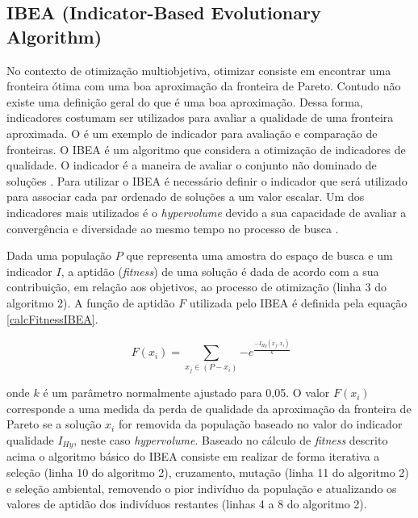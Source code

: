 \documentclass[conference]{IEEEtran}
\begin{document}
\subsection{IBEA (Indicator-Based Evolutionary Algorithm)}
No contexto de otimização multiobjetiva, otimizar consiste em encontrar uma fronteira ótima com uma boa aproximação da fronteira de Pareto. Contudo não existe uma definição geral do que é uma boa aproximação. Dessa forma, indicadores costumam ser utilizados para avaliar a qualidade de uma fronteira aproximada. O  é um exemplo de indicador para avaliação e comparação de fronteiras. 
O IBEA é um algoritmo que considera
a otimização de indicadores de qualidade. O indicador é a maneira de avaliar o conjunto não dominado de soluções \cite{figueiredo2013algoritmo}.
Para utilizar o IBEA é necessário definir o indicador que será utilizado para associar cada par ordenado de soluções a um valor escalar. Um dos indicadores mais utilizados é o \textit{hypervolume} devido a sua capacidade de avaliar a convergência e diversidade ao mesmo tempo no processo de busca \cite{ishibuchi2008evolutionary}. 

Dada uma população $P$ que representa uma amostra do espaço de busca e um indicador $I$, a aptidão (\textit{fitness}) de uma solução é dada de acordo com a sua contribuição, em relação aos objetivos, ao processo de otimização (linha 3 do algoritmo 2). A função de aptidão $F$ utilizada pelo IBEA é definida pela equação \ref{calcFitnessIBEA}.

\begin{equation}
\ F(x_i) = \sum_{x_j \in (P-x_i)} {-e^\frac{-I_{Hy}(x_j,x_i)}{k}}
\label{calcFitnessIBEA}
\end{equation}



onde $k$ é um parâmetro normalmente ajustado para 0,05. O valor $F(x_i)$ corresponde a uma medida da perda de qualidade da aproximação da fronteira de Pareto se a solução $x_i$ for removida da população \cite{figueiredo2013algoritmo} baseado no valor do indicador qualidade $I_{Hy}$, neste caso 
\textit{hypervolume}.
Baseado no cálculo de \textit{fitness} descrito acima o algoritmo básico do IBEA consiste em realizar de forma iterativa a seleção (linha 10 do algoritmo 2), cruzamento, mutação (linha 11 do algoritmo 2) e seleção ambiental, removendo o pior indivíduo da população e atualizando os valores de aptidão dos indivíduos restantes (linhas 4 a 8 do algoritmo 2).
\end{document}
